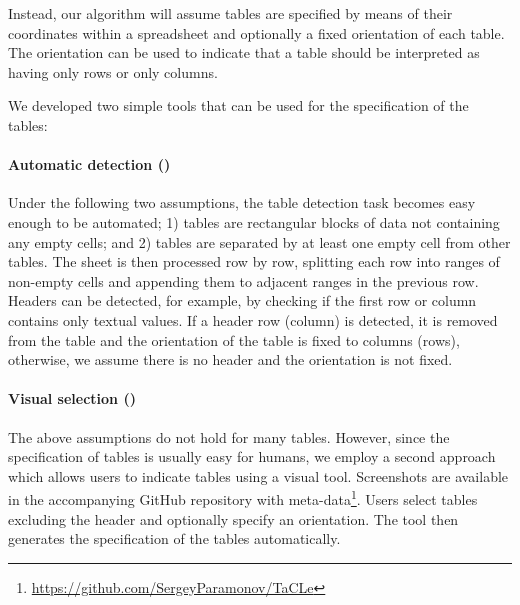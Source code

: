 
Instead, our algorithm will assume tables are specified by means of their coordinates within a spreadsheet and optionally a fixed orientation of each table. The orientation can be used to indicate that a table should be interpreted as having only rows or only columns.

We developed two simple tools that can be used for the specification of the tables:

\paragraph{Automatic detection (\ecautoextract)}
Under the following two assumptions, the table detection task becomes easy enough to be automated; 1) tables are rectangular blocks of data not containing any empty cells; and 2) tables are separated by at least one empty cell from other tables.
The sheet is then processed row by row, splitting each row into ranges of non-empty cells and appending them to adjacent ranges in the previous row.
Headers can be detected, for example, by checking if the first row or column contains only textual values. If a header row (column) is detected, it is removed from the table and the orientation of the table is fixed to columns (rows), otherwise, we assume there is no header and the orientation is not fixed.

\paragraph{Visual selection (\ecvisualextract)}
The above assumptions do not hold for many tables. However, since the specification of tables is usually easy for humans, we employ a second approach which allows users to indicate tables using a visual tool. Screenshots are available in the accompanying GitHub repository with meta-data\footnote{\url{https://github.com/SergeyParamonov/TaCLe}\label{github-link}}.
Users select tables excluding the header and optionally specify an orientation.
The \added{\ecvisualextract{}} tool then generates the specification of the tables automatically.





